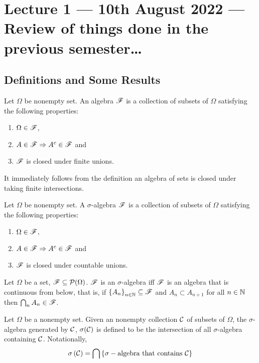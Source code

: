\section{Lecture 1 --- 10th August 2022 --- Review of things done in the previous semester\ldots}
\subsection{Definitions and Some Results}
\begin{definition}[algebra]
    Let $\Omega$ be nonempty set. An algebra ${\mathscr F}$ is a collection of subsets of $\Omega$ satisfying the following properties:
    \begin{enumerate}
	\item $\Omega \in {\mathscr F}$,
	\item $A\in {\mathscr F} \Rightarrow A^c \in {\mathscr F}$ and
	\item ${\mathscr F}$ is closed under finite unions.
    \end{enumerate}
    \label{def:algebra}
\end{definition}

It immediately follows from the definition an algebra of sets is closed under taking finite intersections.

\begin{definition}
    Let $\Omega$ be nonempty set. A $\sigma$-algebra ${\mathscr F}$ is a collection of subsets of $\Omega$ satisfying the following properties:
    \begin{enumerate}
	\item $\Omega \in {\mathscr F}$,
	\item $A\in {\mathscr F} \Rightarrow A^c \in {\mathscr F}$ and
	\item ${\mathscr F}$ is closed under countable unions.
    \end{enumerate}
    \label{def:sigma-algebra}
\end{definition}

\begin{fact}
    Let $\Omega$ be a set, ${\mathscr F} \subseteq {\cal P} (\Omega )$. ${\mathscr F}$ is an $\sigma$-algebra iff ${\mathscr F}$ is an algebra that is continuous from below, that is, if $\left\{ A_n \right\}_{n\in \mathbb N} \subseteq {\mathscr F}$ and $A_n \subset A_{n+1}$ for all $n\in \mathbb N$ then $\bigcap _n A_n \in {\mathscr F}$.
\end{fact}

\begin{definition}
    Let $\Omega$ be a nonempty set. Given an nonempty collection ${\cal C}$ of subsets of $\Omega$, the $\sigma$-algebra generated by ${\cal C}$, $\sigma ({\cal C})$ is defined to be the intersection of all $\sigma$-algebra containing ${\cal C}$. Notationally,
    $$\sigma \left( {\cal C} \right) = \bigcap \left\{ \sigma-\text{algebra that contains  }{\cal C} \right\}$$
    \label{def:generated-sigma-algebra}
\end{definition}

